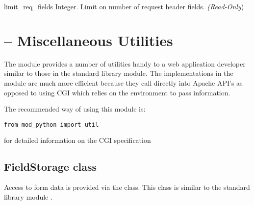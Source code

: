 \begin{memberdesc}[server]{limit_req_fields}
  Integer. Limit on number of request header fields.
  \emph{(Read-Only})
\end{memberdesc}

\section{ -- Miscellaneous Utilities\label{pyapi-util}}

The  module provides a number of utilities handy to a web
application developer similar to those in the standard library
 module. The implementations in the  module
are much more efficient because they call directly into Apache API's
as opposed to using CGI which relies on the environment to pass
information.

The recommended way of using this module is:
\begin{verbatim}
from mod_python import util
\end{verbatim}

\begin{seealso}
	   {for detailed information on the CGI specification}
\end{seealso}

\subsection{FieldStorage class\label{pyapi-util-fstor}}

Access to form data is provided via the 
class. This class is similar to the standard library module
 .

